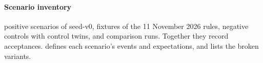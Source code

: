 \paragraph{Scenario inventory}
\SeedPositiveCount{} positive scenarios of seed-v0, \SeedWitnessCount{} fixtures of the
11 November 2026 rules, \SeedNegativeCount{} negative controls with \SeedNegativeCount{}
control twins, and \SeedComparisonCount{} comparison runs. Together they record
\SeedAcceptCount{} acceptances.  defines each scenario's
events and expectations, and  lists the broken variants.
